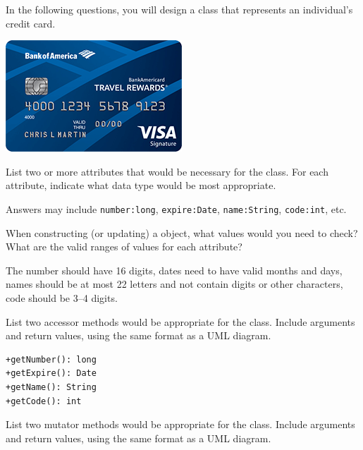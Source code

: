 
In the following questions, you will design a class that represents an individual's credit card.

\begin{center}
\includegraphics{credit-card.png}
\end{center}




\Q List two or more attributes that would be necessary for the  class.
For each attribute, indicate what data type would be most appropriate.

\begin{answer}
Answers may include \verb|number:long|, \verb|expire:Date|, \verb|name:String|, \verb|code:int|, etc.
\end{answer}


\Q When constructing (or updating) a  object, what values would you need to check?
What are the valid ranges of values for each attribute?

\begin{answer}
The number should have 16 digits, dates need to have valid months and days, names should be at most 22 letters and not contain digits or other characters, code should be 3--4 digits.
\end{answer}


\Q List two accessor methods would be appropriate for the  class.
Include arguments and return values, using the same format as a UML diagram.

\begin{answer}[5em]
\begin{verbatim}
+getNumber(): long
+getExpire(): Date
+getName(): String
+getCode(): int
\end{verbatim}
\end{answer}


\Q List two mutator methods would be appropriate for the  class.
Include arguments and return values, using the same format as a UML diagram.

